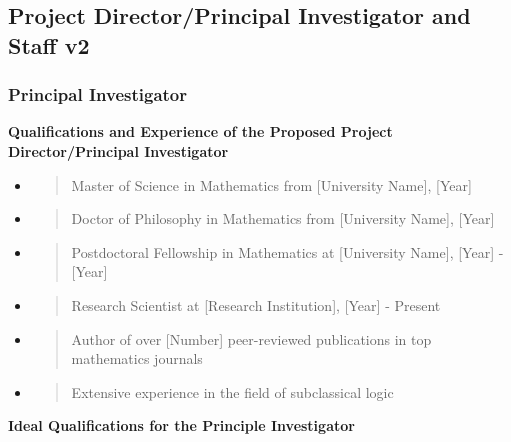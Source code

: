 \hypertarget{project-directorprincipal-investigator-and-staff-v2}{%
\subsection{Project Director/Principal Investigator and Staff
v2}\label{project-directorprincipal-investigator-and-staff-v2}}

\hypertarget{principal-investigator}{%
\subsubsection{Principal Investigator}\label{principal-investigator}}

\textbf{Qualifications and Experience of the Proposed Project
Director/Principal Investigator}

\begin{itemize}
\item
  \begin{quote}
  Master of Science in Mathematics from {[}University Name{]},
  {[}Year{]}
  \end{quote}
\item
  \begin{quote}
  Doctor of Philosophy in Mathematics from {[}University Name{]},
  {[}Year{]}
  \end{quote}
\item
  \begin{quote}
  Postdoctoral Fellowship in Mathematics at {[}University Name{]},
  {[}Year{]} - {[}Year{]}
  \end{quote}
\item
  \begin{quote}
  Research Scientist at {[}Research Institution{]}, {[}Year{]} - Present
  \end{quote}
\item
  \begin{quote}
  Author of over {[}Number{]} peer-reviewed publications in top
  mathematics journals
  \end{quote}
\item
  \begin{quote}
  Extensive experience in the field of subclassical logic
  \end{quote}
\end{itemize}

\textbf{Ideal Qualifications for the Principle Investigator}

